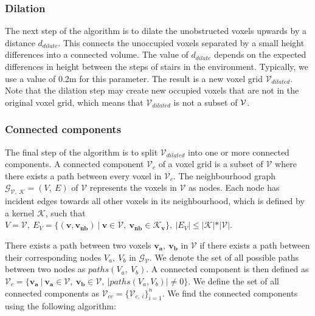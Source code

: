 \subsubsection{Dilation}
The next step of the algorithm is to dilate the unobstructed voxels upwards by a distance \(d_{dilate}\). This connects the unoccupied voxels separated by a small height differences into a connected volume. The value of \(d_{dilate}\) depends on the expected differences in height between the steps of stairs in the environment. Typically, we use a value of 0.2m for this parameter. The result is a new voxel grid \(\mathcal{V}_{dilated}\). Note that the dilation step may create new occupied voxels that are not in the original voxel grid, which means that \(\mathcal{V}_{dilated}\) is not a subset of \(\mathcal{V}\).

\subsubsection{Connected components}
The final step of the algorithm is to split \(\mathcal{V}_{dilated}\) into one or more connected components. A connected component \(\mathcal{V}_c\) of a voxel grid is a subset of \(\mathcal{V}\) where there exists a path between every voxel in \(\mathcal{V}_c\). The neighbourhood graph \(\mathcal{G}_{\mathcal{V},\ \mathcal{K}} = (V,\ E)\) of \(\mathcal{V}\) represents the voxels in \(\mathcal{V}\) as nodes. Each node has incident edges towards all other voxels in its neighbourhood, which is defined by a kernel \(\mathcal{K}\), such that \(V = \mathcal{V},\ E_{V} = \{(\boldsymbol{v}, \boldsymbol{v_{nb}})\ |\ \boldsymbol{v} \in \mathcal{V},\ \boldsymbol{v_{nb}} \in \mathcal{K}_{\boldsymbol{v}}\},\ |E_{V}| \leq |\mathcal{K}|*|\mathcal{V}|\). 

There exists a path between two voxels \(\boldsymbol{v_a},\ \boldsymbol{v_b}\) in \(\mathcal{V}\) if there exists a path between their corresponding nodes \(V_a,\ V_b\) in \(\mathcal{G}_{\mathcal{V}}\). We denote the set of all possible paths between two nodes as \(paths(V_a,\ V_b)\). A connected component is then defined as \(\mathcal{V}_c=\{\boldsymbol{v_a}\ |\ \boldsymbol{v_a} \in \mathcal{V},\ \boldsymbol{v_b} \in \mathcal{V},\ |paths(V_a, V_b)| \neq 0\}\). We define the set of all connected components as \(\mathcal{V}_{cc}=\{\mathcal{V}_{c,\ i}\}_{i=1}^n\). We find the connected components using the following algorithm:

